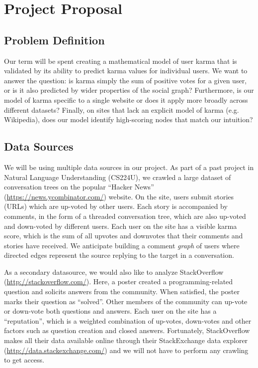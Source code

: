 \documentclass[10pt]{article}
\begin{document}
\section{Project Proposal} \subsection{Problem Definition}
Our term will be spent creating a mathematical model of user karma that is
validated by its ability to predict karma values for individual users. We want
to answer the question: is karma simply the sum of positive votes for a given
user, or is it also predicted by wider properties of the social graph?
Furthermore, is our model of karma specific to a single website or does it apply
more broadly across different datasets?  Finally, on sites that lack an explicit
model of karma (e.g. Wikipedia), does our model identify high-scoring nodes that
match our intuition?

\subsection{Data Sources}
We will be using multiple data sources in our project. As part of a past project
in Natural Language Understanding (CS224U), we crawled a large dataset of
conversation trees on the popular ``Hacker News''
(\url{https://news.ycombinator.com/}) website. On the site, users submit stories
(URLs) which are up-voted by other users. Each story is accompanied by comments,
in the form of a threaded conversation tree, which are also up-voted and
down-voted by different users. Each user on the site has a visible karma score,
which is the sum of all upvotes and downvotes that their comments and stories
have received.  We anticipate building a comment \textit{graph} of users where
directed edges represent the source replying to the target in a conversation.

As a secondary datasource, we would also like to analyze StackOverflow
(\url{http://stackoverflow.com/}). Here, a poster created a programming-related
question and solicits answers from the community. When satisfied, the poster
marks their question as ``solved''. Other members of the community can up-vote
or down-vote both questions and answers. Each user on the site has a
``reputation'', which is a weighted combination of up-votes, down-votes and
other factors such as question creation and closed answers. Fortunately,
StackOverflow makes all their data available online through their StackExchange
data explorer (\url{http://data.stackexchange.com/}) and we will not have to
perform any crawling to get access.
\end{document}
